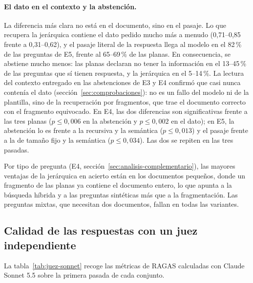 \paragraph{El dato en el contexto y la abstención.} La diferencia más clara no está en el documento, sino en el pasaje. Lo que recupera la jerárquica contiene el dato pedido mucho más a menudo (0,71--0,85 frente a 0,31--0,62), y el pasaje literal de la respuesta llega al modelo en el 82\,\% de las preguntas de E5, frente al 65--69\,\% de las planas. En consecuencia, se abstiene mucho menos: las planas declaran no tener la información en el 13--45\,\% de las preguntas que sí tienen respuesta, y la jerárquica en el 5--14\,\%. La lectura del contexto entregado en las abstenciones de E3 y E4 confirmó que casi nunca contenía el dato (sección~\ref{sec:comprobaciones}): no es un fallo del modelo ni de la plantilla, sino de la recuperación por fragmentos, que trae el documento correcto con el fragmento equivocado. En E4, las dos diferencias son significativas frente a las tres planas ($p \le 0{,}006$ en la abstención y $p \le 0{,}002$ en el dato); en E5, la abstención lo es frente a la recursiva y la semántica ($p \le 0{,}013$) y el pasaje frente a la de tamaño fijo y la semántica ($p \le 0{,}034$). Las dos se repiten en las tres pasadas.

Por tipo de pregunta (E4, sección~\ref{sec:analisis-complementario}), las mayores ventajas de la jerárquica en acierto están en los documentos pequeños, donde un fragmento de las planas ya contiene el documento entero, lo que apunta a la búsqueda híbrida y a las preguntas sintéticas más que a la fragmentación. Las preguntas mixtas, que necesitan dos documentos, fallan en todas las variantes.

\subsection{Calidad de las respuestas con un juez independiente}
\label{sec:resultados-juez}

La tabla~\ref{tab:juez-sonnet} recoge las métricas de RAGAS calculadas con Claude Sonnet 5.5 sobre la primera pasada de cada conjunto.

